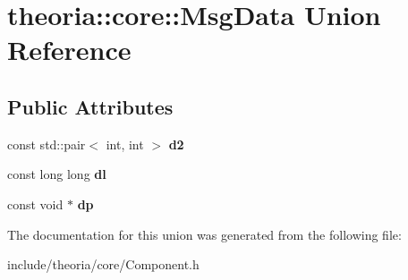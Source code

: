\hypertarget{uniontheoria_1_1core_1_1MsgData}{\section{theoria\+:\+:core\+:\+:Msg\+Data Union Reference}
\label{uniontheoria_1_1core_1_1MsgData}
}
\subsection*{Public Attributes}
\begin{DoxyCompactItemize}
\item 
\hypertarget{uniontheoria_1_1core_1_1MsgData_a6bdc61f44d3b09181a5b697dcaa9531f}{const std\+::pair$<$ int, int $>$ {\bfseries d2}}\label{uniontheoria_1_1core_1_1MsgData_a6bdc61f44d3b09181a5b697dcaa9531f}

\item 
\hypertarget{uniontheoria_1_1core_1_1MsgData_ab64ff11671488ddf8fededca84809692}{const long long {\bfseries dl}}\label{uniontheoria_1_1core_1_1MsgData_ab64ff11671488ddf8fededca84809692}

\item 
\hypertarget{uniontheoria_1_1core_1_1MsgData_a9e1249c381a92c9c628564f03cac7dcd}{const void $\ast$ {\bfseries dp}}\label{uniontheoria_1_1core_1_1MsgData_a9e1249c381a92c9c628564f03cac7dcd}

\end{DoxyCompactItemize}


The documentation for this union was generated from the following file\+:\begin{DoxyCompactItemize}
\item 
include/theoria/core/Component.\+h\end{DoxyCompactItemize}
